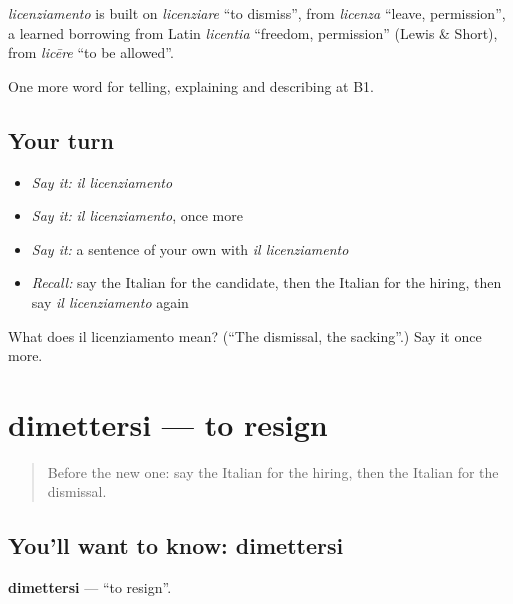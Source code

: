 \begin{cousinweb}
\emph{licenziamento} is built on \emph{licenziare} \textquotedblleft{}to dismiss\textquotedblright{}, from \emph{licenza} \textquotedblleft{}leave, permission\textquotedblright{}, a learned borrowing from Latin \emph{licentia} \textquotedblleft{}freedom, permission\textquotedblright{} (Lewis \& Short), from \emph{licēre} \textquotedblleft{}to be allowed\textquotedblright{}.
\end{cousinweb}

\begin{grammarlens}[title={What you've built}]
One more word for telling, explaining and describing at B1.
\end{grammarlens}

\subsection*{Your turn}
\begin{itemize}
\raggedright
  \item \emph{Say it:} \emph{il licenziamento}
  \item \emph{Say it:} \emph{il licenziamento}, once more
  \item \emph{Say it:} a sentence of your own with \emph{il licenziamento}
  \item \emph{Recall:} say the Italian for the candidate, then the Italian for the hiring, then say \emph{il licenziamento} again
\end{itemize}

\begin{tcolorbox}[breakable,colback=teal!4,colframe=teal!35!black,title={Before you move on}]
What does il licenziamento mean? (\textquotedblleft{}The dismissal, the sacking\textquotedblright{}.) Say it once more.
\end{tcolorbox}
\section[dimettersi]{dimettersi — to resign}

\label{lesson:IT-C357-dimettersi}



\begin{quote}
Before the new one: say the Italian for the hiring, then the Italian for the dismissal.
\end{quote}

\subsection*{You'll want to know: dimettersi}
\textbf{dimettersi} — \textquotedblleft{}to resign\textquotedblright{}.

